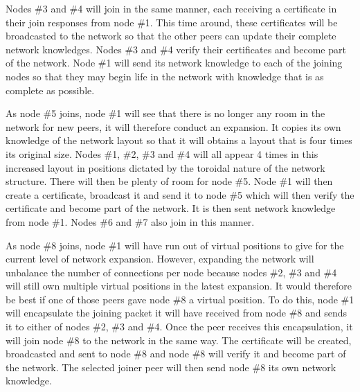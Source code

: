 \documentclass[ %
                    author={Luke Murray},
                supervisor={Dr. Simon Hollis},
                     title={Shadow Peer-to-Peer Networks},
                  subtitle={},
                    degree={MEng},
                      year={2013} ]{thesis}
\begin{document}
Nodes \#3 and \#4 will join in the same manner, each receiving a certificate in their join responses from node \#1. This time around, these certificates will be broadcasted to the network so that the other peers can update their complete network knowledges. Nodes \#3 and \#4 verify their certificates and become part of the network. Node \#1 will send its network knowledge to each of the joining nodes so that they may begin life in the network with knowledge that is as complete as possible.

As node \#5 joins, node \#1 will see that there is no longer any room in the network for new peers, it will therefore conduct an expansion. It copies its own knowledge of the network layout so that it will obtains a layout that is four times its original size. Nodes \#1, \#2, \#3 and \#4 will all appear 4 times in this increased layout in positions dictated by the toroidal nature of the network structure. There will then be plenty of room for node \#5. Node \#1 will then create a certificate, broadcast it and send it to node \#5 which will then verify the certificate and become part of the network. It is then sent network knowledge from node \#1. Nodes \#6 and \#7 also join in this manner.

As node \#8 joins, node \#1 will have run out of virtual positions to give for the current level of network expansion. However, expanding the network will unbalance the number of connections per node because nodes \#2, \#3 and \#4 will still own multiple virtual positions in the latest expansion. It would therefore be best if one of those peers gave node \#8 a virtual position. To do this, node \#1 will encapsulate the joining packet it will have received from node \#8 and sends it to either of nodes \#2, \#3 and \#4. Once the peer receives this encapsulation, it will join node \#8 to the network in the same way. The certificate will be created, broadcasted and sent to node \#8 and node \#8 will verify it and become part of the network. The selected joiner peer will then send node \#8 its own network knowledge.
\end{document}

